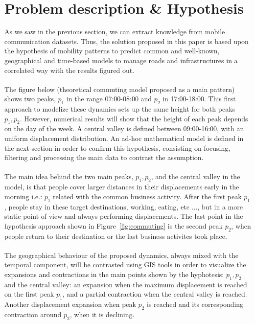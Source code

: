 \newpage

\section{Problem description \& Hypothesis}
As we saw in the previous section, we can extract knowledge from mobile communication datasets. Thus, the solution proposed in this paper is based upon the hypothesis of mobility patterns to predict common and well-known, geographical and time-based models to manage roads and infrastructures in a correlated way with the results figured out.
\\
\\
The figure below (theoretical commuting model proposed as a main pattern) shows two peaks, $p_1$ in the range 07:00-08:00 and $p_2$ in 17:00-18:00. This first approach to modelize these dynamics sets up the same height for both peaks $p_1, p_2$. However, numerical results will show that the height of each peak depends on the day of the week. A central valley is defined between 09:00-16:00, with an uniform displacement distribution. An ad-hoc mathematical model is defined in the next section in order to confirm this hypothesis, consisting on focusing, filtering and processing the main data to contrast the assumption.
\\
\\
The main idea behind the two main peaks, $p_1, p_2$, and the central valley in the model, is that people cover larger distances in their displacements early in the morning i.e.: $p_1$ related with the common business activity. After the first peak $p_1$, people stay in these target destinations, working, eating, etc ..., but in a more static point of view and always performing displacements. The last point in the hypothesis approach shown in Figure~\ref{fig:commuting} is the second peak $p_2$, when people return to their destination or the last business activites took place.
\\
\\
The geographical behaviour of the proposed dynamics, always mixed with the temporal component, will be contrasted using GIS tools in order to visualize the expansions and contractions in the main points shown by the hyphotesis: $p_1, p_2$ and the central valley: an expansion when the maximum displacement is reached on the first peak $p_1$, and a partial contraction when the central valley is reached. Another displacement expansion when peak $p_2$ is reached and its corresponding contraction around $p_2$, when it is declining.



